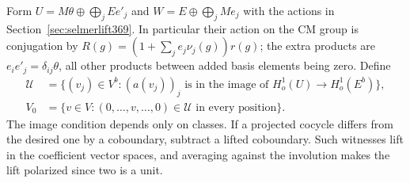 \documentclass[a4paper,11pt]{article}
\theoremstyle{definition}
\theoremstyle{remark}
\numberwithin{equation}{section}
\begin{document}
Form \(U=M\theta\oplus\bigoplus_j E e'_j\) and
\(W=E\oplus\bigoplus_j M e_j\) with the actions in
Section~\ref{sec:selmerlift369}. In particular their action
on the CM group is conjugation by
\(R(g)=(1+\sum_j e_j\nu_j(g))r(g)\); the extra products
are \(e_i e'_j=\delta_{ij}\theta\), all other products
between added basis elements being zero. Define
\[
 \begin{split}
 \mathcal U &=\{(v_j)\in V^b:(a(v_j))_j\text{ is in the
  image of }H^1_o(U)\longrightarrow H^1_o(E^b)\},\\
 V_0&=\{v\in V:(0,\ldots,v,\ldots,0)\in\mathcal U
                        \text{ in every position}\}.
 \end{split}
\]
The image condition depends only on classes. If a projected
cocycle differs from the desired one by a coboundary,
subtract a lifted coboundary. Such witnesses lift in the
coefficient vector spaces, and averaging against the
involution makes the lift polarized since two is a unit.
\end{document}

